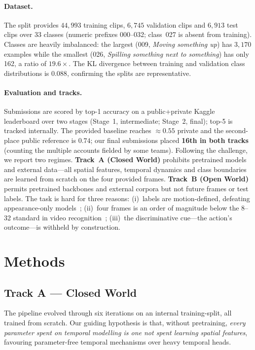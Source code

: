 \documentclass[10pt,twocolumn,letterpaper]{article}
\begin{document}
\paragraph{Dataset.}
The split provides $44{,}993$ training clips, $6{,}745$ validation clips and
$6{,}913$ test clips over 33 classes (numeric prefixes 000--032; class~027 is
absent from training). Classes are heavily imbalanced: the largest (009,
\emph{Moving something up}) has $3{,}170$ examples while the smallest (026,
\emph{Spilling something next to something}) has only 162, a ratio of
$19.6\times$. The KL divergence between training and validation class
distributions is $0.088$, confirming the splits are representative.

\paragraph{Evaluation and tracks.}
Submissions are scored by top-1 accuracy on a public+private Kaggle leaderboard
over two stages (Stage~1, intermediate; Stage~2, final); top-5 is tracked
internally. The provided baseline reaches ${\approx}0.55$ private and the
second-place public reference is $0.74$; our final submissions placed
\textbf{16th in both tracks} (counting the multiple accounts fielded by some
teams). Following the challenge, we report two regimes. \textbf{Track~A (Closed World)} prohibits pretrained
models and external data---all spatial features, temporal dynamics and class
boundaries are learned from scratch on the four provided frames. \textbf{Track~B
(Open World)} permits pretrained backbones and external corpora but not future
frames or test labels. The task is hard for three reasons: (i)~labels are
motion-defined, defeating appearance-only models~\cite{goyal2017ssv2}; (ii)~four
frames is an order of magnitude below the 8--32 standard in video
recognition~\cite{lin2019tsm,bertasius2021timesformer}; (iii)~the discriminative
cue---the action's outcome---is withheld by construction.

\section{Methods}
\label{sec:method}

\subsection{Track A --- Closed World}
\label{sec:trackA}
The pipeline evolved through six iterations on an internal training-split, all
trained from scratch. Our guiding hypothesis is that, without pretraining,
\emph{every parameter spent on temporal modelling is one not spent learning
spatial features}, favouring parameter-free temporal mechanisms over heavy
temporal heads.
\end{document}
